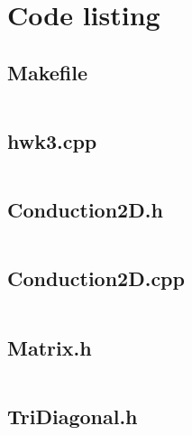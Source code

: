 \documentclass{article}
\begin{document}
\section*{Code listing}

\subsection*{Makefile}
\inputminted[fontsize=\small]{Makefile}{../cpp/Makefile}

\subsection*{hwk3.cpp}
\inputminted[fontsize=\small]{c++}{../cpp/hwk3.cpp}

\subsection*{Conduction2D.h}
\inputminted[fontsize=\small]{c++}{../cpp/Conduction2D.h}

\subsection*{Conduction2D.cpp}
\inputminted[fontsize=\small]{c++}{../cpp/Conduction2D.cpp}

\subsection*{Matrix.h}
\inputminted[fontsize=\small]{c++}{../cpp/Matrix.h}

\subsection*{TriDiagonal.h}
\inputminted[fontsize=\small]{c++}{../cpp/TriDiagonal.h}
\end{document}
